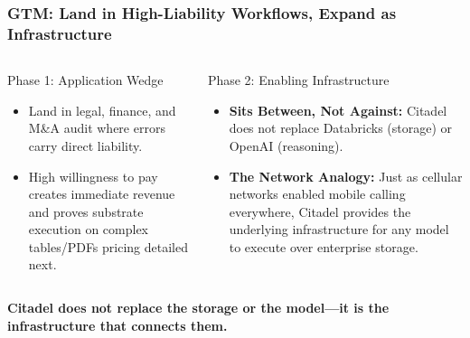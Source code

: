 \documentclass[aspectratio=169,11pt]{beamer}
\begin{document}
	\begin{frame}
		\frametitle{GTM: Land in High-Liability Workflows, Expand as Infrastructure}

		\begin{center}
		\end{center}
		\vfill
		\begin{columns}[T]
			\begin{block}{\small Phase 1: Application Wedge}
				\begin{itemize}\scriptsize
					\item Land in legal, finance, and M\&A audit where errors carry direct liability.
					\item High willingness to pay creates immediate revenue and proves substrate execution on complex tables/PDFs \textemdash{} pricing detailed next.
				\end{itemize}
			\end{block}

			\begin{block}{\small Phase 2: Enabling Infrastructure}
				\begin{itemize}\scriptsize
					\item \textbf{Sits Between, Not Against:} Citadel does not replace Databricks (storage) or OpenAI (reasoning).
					\item \textbf{The Network Analogy:} Just as cellular networks enabled mobile calling everywhere, Citadel provides the underlying infrastructure for any model to execute over enterprise storage.
				\end{itemize}
			\end{block}
		\end{columns}
		\vfill
		\centering
		{\color{CitadelHighlight}\bfseries Citadel does not replace the storage or the model—it is the infrastructure that connects them.}
	\end{frame}
\end{document}
